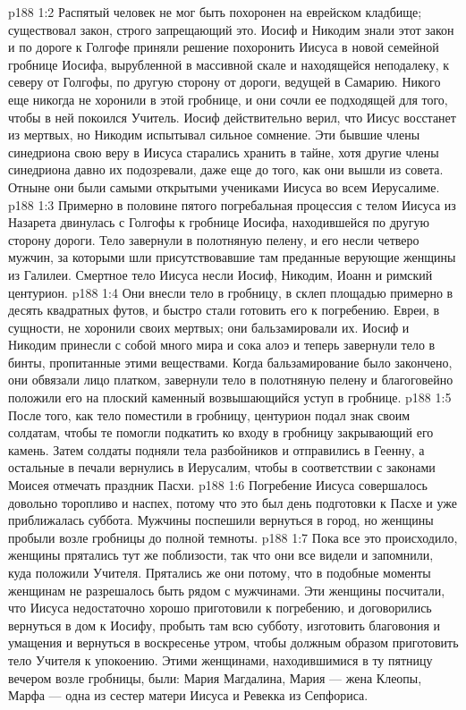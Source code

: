 \vs p188 1:2 Распятый человек не мог быть похоронен на еврейском кладбище; существовал закон, строго запрещающий это. Иосиф и Никодим знали этот закон и по дороге к Голгофе приняли решение похоронить Иисуса в новой семейной гробнице Иосифа, вырубленной в массивной скале и находящейся неподалеку, к северу от Голгофы, по другую сторону от дороги, ведущей в Самарию. Никого еще никогда не хоронили в этой гробнице, и они сочли ее подходящей для того, чтобы в ней покоился Учитель. Иосиф действительно верил, что Иисус восстанет из мертвых, но Никодим испытывал сильное сомнение. Эти бывшие члены синедриона свою веру в Иисуса старались хранить в тайне, хотя другие члены синедриона давно их подозревали, даже еще до того, как они вышли из совета. Отныне они были самыми открытыми учениками Иисуса во всем Иерусалиме.
\vs p188 1:3 Примерно в половине пятого погребальная процессия с телом Иисуса из Назарета двинулась с Голгофы к гробнице Иосифа, находившейся по другую сторону дороги. Тело завернули в полотняную пелену, и его несли четверо мужчин, за которыми шли присутствовавшие там преданные верующие женщины из Галилеи. Смертное тело Иисуса несли Иосиф, Никодим, Иоанн и римский центурион.
\vs p188 1:4 Они внесли тело в гробницу, в склеп площадью примерно в десять квадратных футов, и быстро стали готовить его к погребению. Евреи, в сущности, не хоронили своих мертвых; они бальзамировали их. Иосиф и Никодим принесли с собой много мира и сока алоэ и теперь завернули тело в бинты, пропитанные этими веществами. Когда бальзамирование было закончено, они обвязали лицо платком, завернули тело в полотняную пелену и благоговейно положили его на плоский каменный возвышающийся уступ в гробнице.
\vs p188 1:5 После того, как тело поместили в гробницу, центурион подал знак своим солдатам, чтобы те помогли подкатить ко входу в гробницу закрывающий его камень. Затем солдаты подняли тела разбойников и отправились в Геенну, а остальные в печали вернулись в Иерусалим, чтобы в соответствии с законами Моисея отмечать праздник Пасхи.
\vs p188 1:6 Погребение Иисуса совершалось довольно торопливо и наспех, потому что это был день подготовки к Пасхе и уже приближалась суббота. Мужчины поспешили вернуться в город, но женщины пробыли возле гробницы до полной темноты.
\vs p188 1:7 Пока все это происходило, женщины прятались тут же поблизости, так что они все видели и запомнили, куда положили Учителя. Прятались же они потому, что в подобные моменты женщинам не разрешалось быть рядом с мужчинами. Эти женщины посчитали, что Иисуса недостаточно хорошо приготовили к погребению, и договорились вернуться в дом к Иосифу, пробыть там всю субботу, изготовить благовония и умащения и вернуться в воскресенье утром, чтобы должным образом приготовить тело Учителя к упокоению. Этими женщинами, находившимися в ту пятницу вечером возле гробницы, были: Мария Магдалина, Мария --- жена Клеопы, Марфа --- одна из сестер матери Иисуса и Ревекка из Сепфориса.
